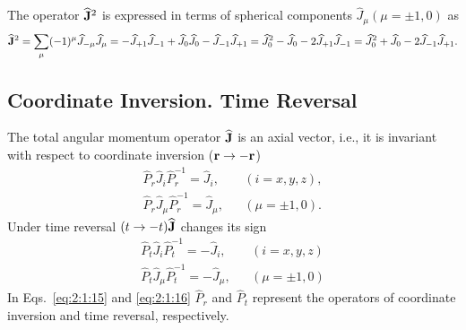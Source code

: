 The operator $\widehat{\mathbf{J}}^{2}$ is expressed in terms of spherical components $\widehat{J}_{\mu}(\mu= \pm 1,0)$ as
\begin{equation}
\widehat{\mathbf{J}}^{2}=\sum_{\mu}(-1)^{\mu} \widehat{J}_{-\mu} \widehat{J}_{\mu}=-\widehat{J}_{+1} \widehat{J}_{-1}+\widehat{J}_{0} \widehat{J}_{0}-\widehat{J}_{-1} \widehat{J}_{+1}=\widehat{J}_{0}^{2}-\widehat{J}_{0}-2 \widehat{J}_{+1} \widehat{J}_{-1}=\widehat{J}_{0}^{2}+\widehat{J}_{0}-2 \widehat{J}_{-1} \widehat{J}_{+1}. \label{eq:2:1:14}
\end{equation}
\subsection{Coordinate Inversion. Time Reversal}
The total angular momentum operator $\widehat{\mathbf{J}}$ is an axial vector, i.e., it is invariant with respect to coordinate inversion ($\mathbf{r} \rightarrow-\mathbf{r}$)
\begin{equation}
\begin{aligned}
\hat{P}_{r} \hat{J}_{i} \hat{P}_{r}^{-1}=\hat{J}_{i}, && (i=x, y, z),  \label{eq:2:1:15}\\
\hat{P}_{r} \hat{J}_{\mu} \hat{P}_{r}^{-1}=\hat{J}_{\mu}, && (\mu= \pm 1,0).
\end{aligned}
\end{equation}
Under time reversal $(t \rightarrow-t) \widehat{\mathbf{J}}$ changes its sign
\begin{equation}
\begin{aligned}
\hat{P}_{t} \hat{J}_{i} \hat{P}_{t}^{-1}=-\hat{J}_{i}, && (i=x, y, z)  \label{eq:2:1:16}\\
\hat{P}_{t} \hat{J}_{\mu} \hat{P}_{t}^{-1}=-\hat{J}_{\mu}, && (\mu= \pm 1,0)
\end{aligned}
\end{equation}
In Eqs.~\eqref{eq:2:1:15} and \eqref{eq:2:1:16} $\widehat{P}_{r}$ and $\widehat{P}_{t}$ represent the operators of coordinate inversion and time reversal, respectively.

